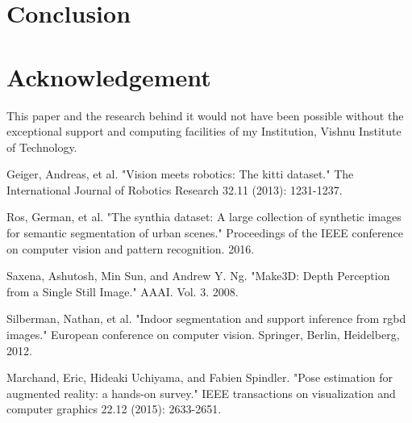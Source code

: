 \documentclass{article}
\begin{document}
\section{Conclusion}
\section{Acknowledgement}
This paper and the research behind it would not have been possible without the exceptional support and computing facilities of my Institution, Vishnu Institute of Technology.
\begin{thebibliography}{10}
 Geiger, Andreas, et al. "Vision meets robotics: The kitti dataset." The International Journal of Robotics Research 32.11 (2013): 1231-1237.

 Ros, German, et al. "The synthia dataset: A large collection of synthetic images for semantic segmentation of urban scenes." Proceedings of the IEEE conference on computer vision and pattern recognition. 2016.

 Saxena, Ashutosh, Min Sun, and Andrew Y. Ng. "Make3D: Depth Perception from a Single Still Image." AAAI. Vol. 3. 2008.

 Silberman, Nathan, et al. "Indoor segmentation and support inference from rgbd images." European conference on computer vision. Springer, Berlin, Heidelberg, 2012.

 Marchand, Eric, Hideaki Uchiyama, and Fabien Spindler. "Pose estimation for augmented reality: a hands-on survey." IEEE transactions on visualization and computer graphics 22.12 (2015): 2633-2651.

\end{thebibliography}
\end{document}
